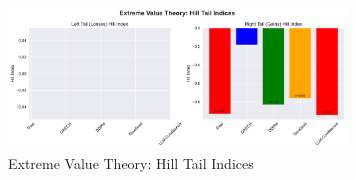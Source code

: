 \begin{figure}[htbp]
\centering
\includegraphics[width=0.8\textwidth]{figures/evt_hill_tail_indices.pdf}
\caption{Extreme Value Theory: Hill Tail Indices}
\label{fig:evthilltailindices}
\end{figure}